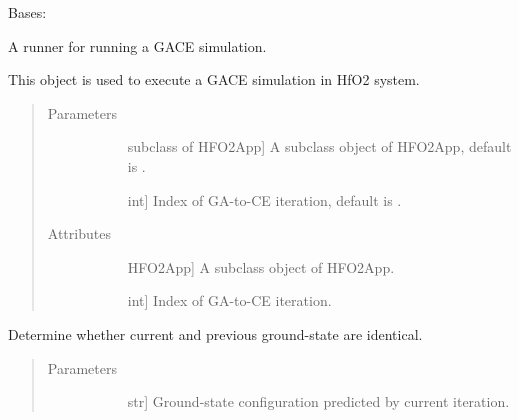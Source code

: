 \documentclass[letterpaper,10pt,english]{sphinxmanual}
\begin{document}

\begin{fulllineitems}
\label{\detokenize{pygace.examples.hfo2:pygace.examples.hfo2.hfo2_gace.Runner}}
Bases: {\hyperref[\detokenize{pygace:pygace.gace.AbstractRunner}]{}}

A runner for running a GACE simulation.

This object is used to execute a GACE simulation in HfO2 system.
\begin{quote}\begin{description}
\item[{Parameters}] \leavevmode\begin{description}
\item[{}] \leavevmode{[}subclass of HFO2App{]}
A subclass object of HFO2App, default is .

\item[{}] \leavevmode{[}int{]}
Index of GA-to-CE iteration, default is .

\end{description}

\item[{Attributes}] \leavevmode\begin{description}
\item[{}] \leavevmode{[}HFO2App{]}
A subclass object of HFO2App.

\item[{}] \leavevmode{[}int{]}
Index of GA-to-CE iteration.

\end{description}

\end{description}\end{quote}

\begin{fulllineitems}
\label{\detokenize{pygace.examples.hfo2:pygace.examples.hfo2.hfo2_gace.Runner.compare_gs}}
Determine whether current and previous ground-state are identical.
\begin{quote}\begin{description}
\item[{Parameters}] \leavevmode\begin{description}
\item[{}] \leavevmode{[}str{]}
Ground-state configuration predicted by current iteration.


\end{description}
\end{description}
\end{quote}
\end{fulllineitems}
\end{fulllineitems}
\end{document}
